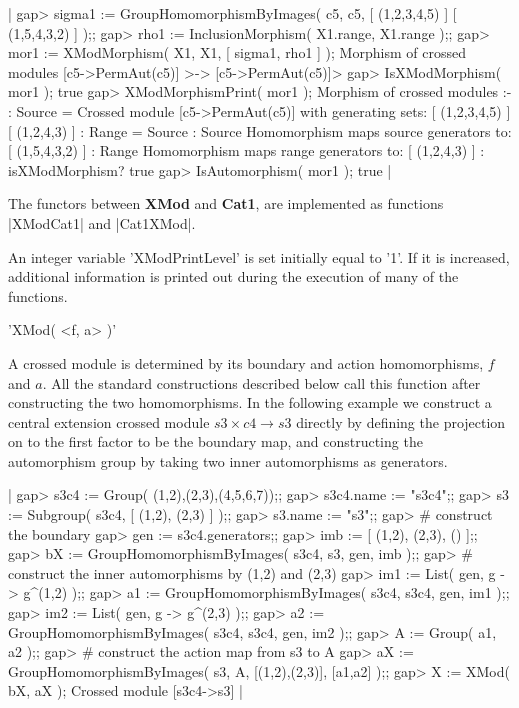 |    gap> sigma1 := GroupHomomorphismByImages( c5, c5, [ (1,2,3,4,5) ]
            [ (1,5,4,3,2) ] );;
    gap> rho1 := InclusionMorphism( X1.range, X1.range );;
    gap> mor1 := XModMorphism( X1, X1, [ sigma1, rho1 ] );
    Morphism of crossed modules [c5->PermAut(c5)] >-> [c5->PermAut(c5)]>
    gap> IsXModMorphism( mor1 );
    true
    gap> XModMorphismPrint( mor1 );
    Morphism of crossed modules :- 
    : Source = Crossed module [c5->PermAut(c5)] with generating sets:
      [ (1,2,3,4,5) ]
      [ (1,2,4,3) ]
    : Range = Source
    : Source Homomorphism maps source generators to:
      [ (1,5,4,3,2) ]
    : Range Homomorphism maps range generators to:
      [ (1,2,4,3) ]
    : isXModMorphism? true
    gap> IsAutomorphism( mor1 );
    true  |

The functors between \textbf{XMod} and \textbf{Cat1}, 
are implemented as functions  |XModCat1| and |Cat1XMod|.

An integer variable 'XModPrintLevel' is set initially equal to '1'.
If it is increased, additional information is printed out during
the execution of many of the functions.



'XMod( <f, a> )'

A crossed module is determined by its boundary and action homomorphisms,
$f$ and $a$.  All the standard constructions described below call this 
function after constructing the two homomorphisms.
In the following example we construct a central extension crossed module
$s3 \times c4 \to s3$  directly by defining the projection on to the
first factor to be the boundary map, and constructing the automorphism
group by taking two inner automorphisms as generators.

|    gap> s3c4 := Group( (1,2),(2,3),(4,5,6,7));;
    gap> s3c4.name := "s3c4";;
    gap> s3 := Subgroup( s3c4, [ (1,2), (2,3) ] );;
    gap> s3.name := "s3";;
    gap> # construct the boundary
    gap> gen := s3c4.generators;;
    gap> imb := [ (1,2), (2,3), () ];;
    gap> bX := GroupHomomorphismByImages( s3c4, s3, gen, imb );;
    gap> # construct the inner automorphisms by (1,2) and (2,3)
    gap> im1 := List( gen, g -> g^(1,2) );;
    gap> a1 := GroupHomomorphismByImages( s3c4, s3c4, gen, im1 );;
    gap> im2 := List( gen, g -> g^(2,3) );;
    gap> a2 := GroupHomomorphismByImages( s3c4, s3c4, gen, im2 );;
    gap> A := Group( a1, a2 );;
    gap> # construct the action map from s3 to A
    gap> aX := GroupHomomorphismByImages( s3, A, [(1,2),(2,3)], [a1,a2] );;
    gap> X := XMod( bX, aX );
    Crossed module [s3c4->s3]  |

